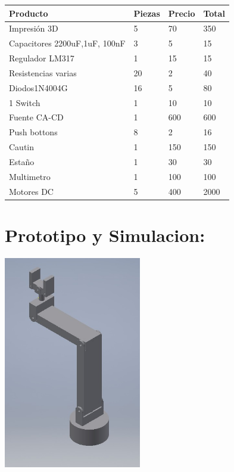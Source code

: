 \documentclass[14pt,a4paper]{article}
\begin{document}
\begin{tabular}{|l|l|l|l|}
\hline
	Producto & Piezas & Precio & Total\\
\hline
	Impresión 3D & 5 & 70 & 350\\

\hline
	Capacitores 2200uF,1uF, 100nF & 3 & 5 & 15\\
\hline
	Regulador LM317 & 1 & 15 & 15\\
\hline
	Resistencias varias & 20 & 2 & 40\\
\hline
	Diodos1N4004G & 16 & 5 & 80\\
\hline
	1 Switch & 1 & 10 & 10\\

\hline
	Fuente CA-CD & 1 & 600 & 600\\
\hline
	Push bottons & 8 & 2 & 16\\
\hline
    Cautin & 1 & 150 & 150\\
\hline
	Estaño & 1 & 30 & 30\\
\hline
	Multimetro & 1 & 100 & 100\\
\hline
    Motores DC & 5 & 400 & 2000\\
\hline
\end{tabular}

\section{Prototipo y Simulacion:}
\begin{center}
\includegraphics[width=6cm]{Proto.jpeg}
\end{center}

\newpage



\end{document}
